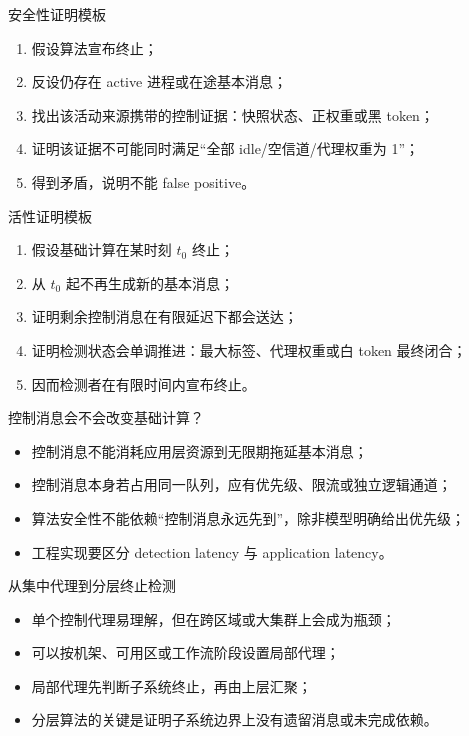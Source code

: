 \documentclass[UTF8,fontset=none,aspectratio=169,10pt]{beamer}
\begin{document}
\begin{frame}{安全性证明模板}
\begin{enumerate}
  \item 假设算法宣布终止；
  \item 反设仍存在 active 进程或在途基本消息；
  \item 找出该活动来源携带的控制证据：快照状态、正权重或黑 token；
  \item 证明该证据不可能同时满足“全部 idle/空信道/代理权重为 1”；
  \item 得到矛盾，说明不能 false positive。
\end{enumerate}
\end{frame}

\begin{frame}{活性证明模板}
\begin{enumerate}
  \item 假设基础计算在某时刻 $t_0$ 终止；
  \item 从 $t_0$ 起不再生成新的基本消息；
  \item 证明剩余控制消息在有限延迟下都会送达；
  \item 证明检测状态会单调推进：最大标签、代理权重或白 token 最终闭合；
  \item 因而检测者在有限时间内宣布终止。
\end{enumerate}
\end{frame}

\begin{frame}{控制消息会不会改变基础计算？}
\begin{itemize}
  \item 控制消息不能消耗应用层资源到无限期拖延基本消息；
  \item 控制消息本身若占用同一队列，应有优先级、限流或独立逻辑通道；
  \item 算法安全性不能依赖“控制消息永远先到”，除非模型明确给出优先级；
  \item 工程实现要区分 detection latency 与 application latency。
\end{itemize}
\vfill
{}
\end{frame}

\begin{frame}{从集中代理到分层终止检测}
\begin{itemize}
  \item 单个控制代理易理解，但在跨区域或大集群上会成为瓶颈；
  \item 可以按机架、可用区或工作流阶段设置局部代理；
  \item 局部代理先判断子系统终止，再由上层汇聚；
  \item 分层算法的关键是证明子系统边界上没有遗留消息或未完成依赖。
\end{itemize}
\end{frame}
\end{document}
